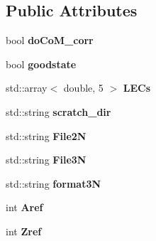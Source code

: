 \subsection*{Public Attributes}
\begin{DoxyCompactItemize}
\item 
\hypertarget{classReadWrite_a3221f4b824dc385b066eca732339ee72}{bool {\bfseries do\-Co\-M\-\_\-corr}}\label{classReadWrite_a3221f4b824dc385b066eca732339ee72}

\item 
\hypertarget{classReadWrite_aaf2753e15a5e7f524d6fde9f15ab357b}{bool {\bfseries goodstate}}\label{classReadWrite_aaf2753e15a5e7f524d6fde9f15ab357b}

\item 
\hypertarget{classReadWrite_a0adff097ed834bf7b3d198440551229d}{std\-::array$<$ double, 5 $>$ {\bfseries L\-E\-Cs}}\label{classReadWrite_a0adff097ed834bf7b3d198440551229d}

\item 
\hypertarget{classReadWrite_ab1360cba72bf9eff52ef50450e7cbeea}{std\-::string {\bfseries scratch\-\_\-dir}}\label{classReadWrite_ab1360cba72bf9eff52ef50450e7cbeea}

\item 
\hypertarget{classReadWrite_a214986ceebcb2d0f0024473529cb0983}{std\-::string {\bfseries File2\-N}}\label{classReadWrite_a214986ceebcb2d0f0024473529cb0983}

\item 
\hypertarget{classReadWrite_aef25f9b501f064cda6afa801714d2635}{std\-::string {\bfseries File3\-N}}\label{classReadWrite_aef25f9b501f064cda6afa801714d2635}

\item 
\hypertarget{classReadWrite_af34878f4a893d1b5f16bdd5488dea9b9}{std\-::string {\bfseries format3\-N}}\label{classReadWrite_af34878f4a893d1b5f16bdd5488dea9b9}

\item 
\hypertarget{classReadWrite_aca5f0cb236385d203bee1161f36d13a4}{int {\bfseries Aref}}\label{classReadWrite_aca5f0cb236385d203bee1161f36d13a4}

\item 
\hypertarget{classReadWrite_a1d6ac500b2e1e8f76c8df799a114120f}{int {\bfseries Zref}}\label{classReadWrite_a1d6ac500b2e1e8f76c8df799a114120f}

\end{DoxyCompactItemize}



